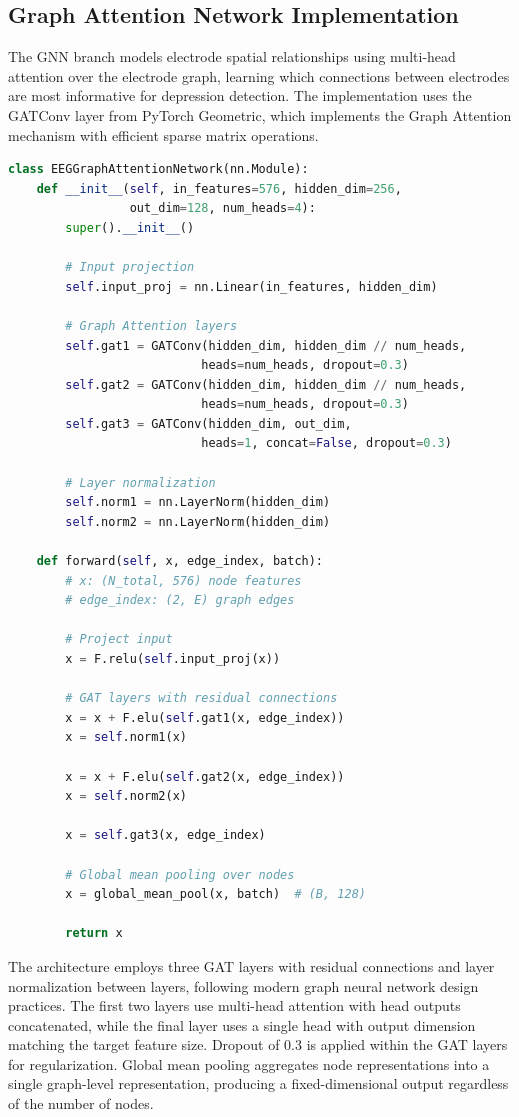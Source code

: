 \subsection{Graph Attention Network Implementation}

The GNN branch models electrode spatial relationships using multi-head attention over the electrode graph, learning which connections between electrodes are most informative for depression detection. The implementation uses the GATConv layer from PyTorch Geometric, which implements the Graph Attention mechanism with efficient sparse matrix operations.

\begin{lstlisting}[language=Python, caption={GNN Encoder Core Structure (gnn\_encoder.py)}]
class EEGGraphAttentionNetwork(nn.Module):
    def __init__(self, in_features=576, hidden_dim=256,
                 out_dim=128, num_heads=4):
        super().__init__()

        # Input projection
        self.input_proj = nn.Linear(in_features, hidden_dim)

        # Graph Attention layers
        self.gat1 = GATConv(hidden_dim, hidden_dim // num_heads,
                           heads=num_heads, dropout=0.3)
        self.gat2 = GATConv(hidden_dim, hidden_dim // num_heads,
                           heads=num_heads, dropout=0.3)
        self.gat3 = GATConv(hidden_dim, out_dim,
                           heads=1, concat=False, dropout=0.3)

        # Layer normalization
        self.norm1 = nn.LayerNorm(hidden_dim)
        self.norm2 = nn.LayerNorm(hidden_dim)

    def forward(self, x, edge_index, batch):
        # x: (N_total, 576) node features
        # edge_index: (2, E) graph edges

        # Project input
        x = F.relu(self.input_proj(x))

        # GAT layers with residual connections
        x = x + F.elu(self.gat1(x, edge_index))
        x = self.norm1(x)

        x = x + F.elu(self.gat2(x, edge_index))
        x = self.norm2(x)

        x = self.gat3(x, edge_index)

        # Global mean pooling over nodes
        x = global_mean_pool(x, batch)  # (B, 128)

        return x
\end{lstlisting}

The architecture employs three GAT layers with residual connections and layer normalization between layers, following modern graph neural network design practices. The first two layers use multi-head attention with head outputs concatenated, while the final layer uses a single head with output dimension matching the target feature size. Dropout of 0.3 is applied within the GAT layers for regularization. Global mean pooling aggregates node representations into a single graph-level representation, producing a fixed-dimensional output regardless of the number of nodes.

